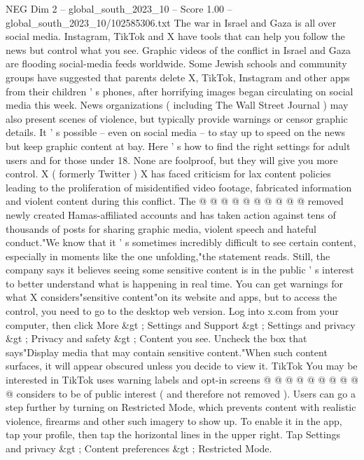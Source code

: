 \begin{textsample}{NEG Dim 2 – global\_south\_2023\_10 – Score 1.00 – global\_south\_2023\_10/102585306.txt}  \label{ex:f2_neg_385}
The war in Israel and Gaza is all over social media.
Instagram, TikTok and X have tools that can help you follow the news but control what you see.
Graphic videos of the conflict in Israel and Gaza are flooding social-media feeds worldwide.
Some Jewish schools and community groups have suggested that parents delete X, TikTok, Instagram and other apps from their children ' s phones, after horrifying images began circulating on social media this week.
News organizations ( including The Wall Street Journal ) may also present scenes of violence, but typically provide warnings or censor graphic details.
It ' s possible -- even on social media -- to stay up to speed on the news but keep graphic content at bay.
Here ' s how to find the right settings for adult users and for those under 18.
None are foolproof, but they will give you more control.
X ( formerly Twitter ) X has faced criticism for lax content policies leading to the proliferation of misidentified video footage, fabricated information and violent content during this conflict.
The @ @ @ @ @ @ @ @ @ @ removed newly created Hamas-affiliated accounts and has taken action against tens of thousands of posts for sharing graphic media, violent speech and hateful conduct."We know that it ' s sometimes incredibly difficult to see certain content, especially in moments like the one unfolding,"the statement reads.
Still, the company says it believes seeing some sensitive content is in the public ' s interest to better understand what is happening in real time.
You can get warnings for what X considers"sensitive content"on its website and apps, but to access the control, you need to go to the desktop web version.
Log into x.com from your computer, then click More \&gt ; Settings and Support \&gt ; Settings and privacy \&gt ; Privacy and safety \&gt ; Content you see.
Uncheck the box that says"Display media that may contain sensitive content."When such content surfaces, it will appear obscured unless you decide to view it.
TikTok You may be interested in TikTok uses warning labels and opt-in screens @ @ @ @ @ @ @ @ @ @ considers to be of public interest ( and therefore not removed ).
Users can go a step further by turning on Restricted Mode, which prevents content with realistic violence, firearms and other such imagery to show up.
To enable it in the app, tap your profile, then tap the horizontal lines in the upper right.
Tap Settings and privacy \&gt ; Content preferences \&gt ; Restricted Mode.

\end{textsample}
